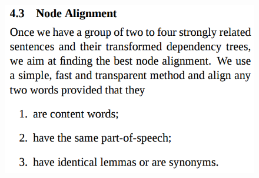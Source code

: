 \documentclass[xcolor={table}]{beamer}
\begin{document}
\begin{frame}[t]{\cite{filippova2008sentence}}
      \begin{figure}[h]
          \centering
      \includegraphics[scale=.25]{images/align-filippova08.png} \\
  \end{figure}
\end{frame}
\end{document}
